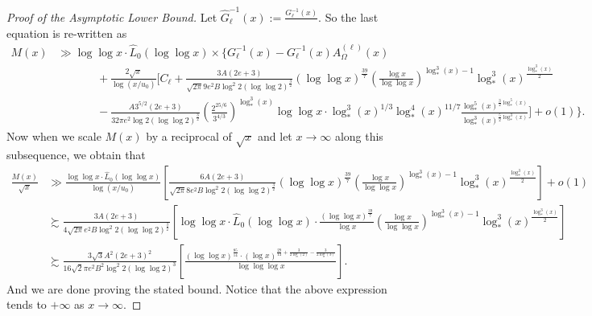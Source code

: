 \documentclass[11pt,reqno,a4letter]{article}
\numberwithin{figure}{section}
\numberwithin{table}{section}
\theoremstyle{plain}
\numberwithin{theorem}{section}
\theoremstyle{definition}
\begin{document}
\begin{proof}[Proof of the Asymptotic Lower Bound]
Let $\widehat{G}_{\ell}^{-1}(x) := \frac{G_{\ell}^{-1}(x)}{}$. 
So the last equation is re-written as 
\begin{align*} 
M(x) & \gg \log\log x \cdot \widehat{L}_0(\log\log x) \times \Biggl\{
     G_{\ell}^{-1}(x) - G_{\ell}^{-1}(x) A_{\Omega}^{(\ell)}(x) \\ 
     & \phantom{\gg G_{\ell}^{-1}\ } + 
     \frac{2\sqrt{x}}{\log(x/u_0)} \Biggl[
     C_{\ell} + 
     \frac{3A(2e+3)}{\sqrt{2\pi}9e^2B \log^2 2 (\log\log 2)^{\frac{3}{2}}}
     (\log\log x)^{\frac{39}{7}} \left( 
     \frac{\log x}{\log\log x}\right)^{\log_{\ast}^3(x)-1} 
     \log_{\ast}^3(x)^{\frac{\log_{\ast}^3(x)}{2}} \\ 
     & \phantom{\gg G_{\ell}^{-1}\ } - 
     \frac{A 3^{5/2} (2e+3)}{32\pi e^2 \log 2 (\log\log 2)^{\frac{3}{2}}} \left( 
      \frac{2^{25/6}}{3^{4/3}}\right)^{\log_{\ast}^3(x)} \log\log x \cdot \log_{\ast}^3(x)^{1/3} 
      \log_{\ast}^4(x)^{11/7} 
      \frac{\log_{\ast}^5(x)^{\frac{3}{2}\log_{\ast}^5(x)}}{\log_{\ast}^3(x)^{\frac{5}{2}\log_{\ast}^3(x)}}
     \Biggr] + o(1)\Biggl\}.  
\end{align*} 
Now when we scale $M(x)$ by a reciprocal of $\sqrt{x}$ and let 
$x \rightarrow \infty$ along this subsequence, we obtain that 
\begin{align*} 
\frac{M(x)}{\sqrt{x}} & \gg \frac{\log\log x \cdot \widehat{L}_0(\log\log x)}{\log(x/u_0)} \left[ 
     \frac{6A(2e+3)}{\sqrt{2\pi}8e^2B \log^2 2 (\log\log 2)^{\frac{3}{2}}}
     (\log\log x)^{\frac{39}{7}} \left( 
     \frac{\log x}{\log\log x}\right)^{\log_{\ast}^3(x)-1} 
     \log_{\ast}^3(x)^{\frac{\log_{\ast}^3(x)}{2}}\right] + 
     o\left(1\right) \\ 
     & \succsim \frac{3A(2e+3)}{4 \sqrt{2\pi}e^2B \log^2 2 (\log\log 2)^{\frac{3}{2}}} \left[ 
     \log\log x \cdot \widehat{L}_0(\log\log x) \cdot 
     \frac{(\log\log x)^{\frac{39}{7}}}{\log x} \left( 
     \frac{\log x}{\log\log x}\right)^{\log_{\ast}^3(x)-1} 
     \log_{\ast}^3(x)^{\frac{\log_{\ast}^3(x)}{2}}\right] \\ 
     & \succsim \frac{3\sqrt{3} A^2(2e+3)^2}{16 \sqrt{2} \pi e^2 B^2 \log^2 2 (\log\log 2)^{3}} \left[ 
     \frac{(\log\log x)^{\frac{85}{14}} \cdot 
     (\log x)^{\frac{29}{14}+\frac{3}{2 \log (2)}-\frac{3}{2 \log (3)}}}{\log\log\log x} \right]. 
\end{align*} 
And we are done proving the stated bound. 
Notice that the above expression tends to $+\infty$ as $x \rightarrow \infty$. 
\end{proof} 
\end{document}
